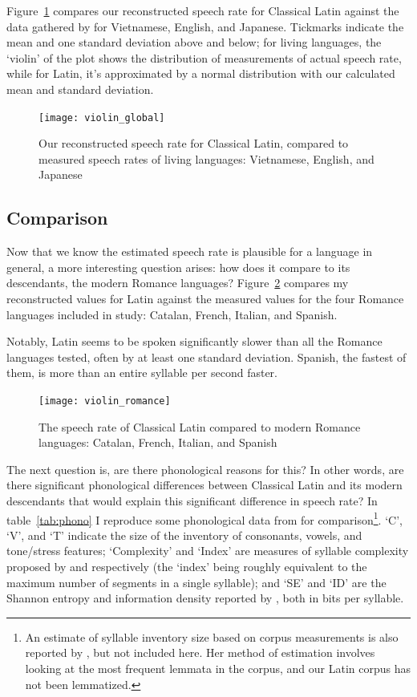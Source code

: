 \documentclass[12pt,twoside,leqno]{article} %
\begin{document}
Figure~\ref{fig:violin1} compares our reconstructed speech rate for Classical Latin against the data gathered by \citet{coupé} for Vietnamese, English, and Japanese. Tickmarks indicate the mean and one standard deviation above and below; for living languages, the `violin' of the plot shows the distribution of measurements of actual speech rate, while for Latin, it's approximated by a normal distribution with our calculated mean and standard deviation.

\begin{figure}[p]
\centering
\caption{Our reconstructed speech rate for Classical Latin, compared to measured speech rates of living languages: Vietnamese, English, and Japanese}
\label{fig:violin1}
\noindent\texttt{[image: violin\_global]}
\end{figure}

\subsection{Comparison}

Now that we know the estimated speech rate is plausible for a language in general, a more interesting question arises: how does it compare to its descendants, the modern Romance languages? Figure~\ref{fig:violin2} compares my reconstructed values for Latin against the measured values for the four Romance languages included in  study: Catalan, French, Italian, and Spanish.

Notably, Latin seems to be spoken significantly slower than all the Romance languages tested, often by at least one standard deviation. Spanish, the fastest of them, is more than an entire syllable per second faster.

\begin{figure}[p]
\centering
\caption{The speech rate of Classical Latin compared to modern Romance languages: Catalan, French, Italian, and Spanish}
\label{fig:violin2}
\noindent\texttt{[image: violin\_romance]}
\end{figure}

The next question is, are there phonological reasons for this? In other words, are there significant phonological differences between Classical Latin and its modern descendants that would explain this significant difference in speech rate? In table~\ref{tab:phono} I reproduce some phonological data from \citet{oh} for comparison\footnote{An estimate of syllable inventory size based on corpus measurements is also reported by \citet{oh}, but not included here. Her method of estimation involves looking at the most frequent lemmata in the corpus, and our Latin corpus has not been lemmatized.}. `C', `V', and `T' indicate the size of the inventory of consonants, vowels, and tone/stress features; `Complexity' and `Index' are measures of syllable complexity proposed by \citet{wals} and \citet{lapsyd} respectively (the `index' being roughly equivalent to the maximum number of segments in a single syllable); and `SE' and `ID' are the Shannon entropy and information density reported by \citet{oh}, both in bits per syllable.
\end{document}
